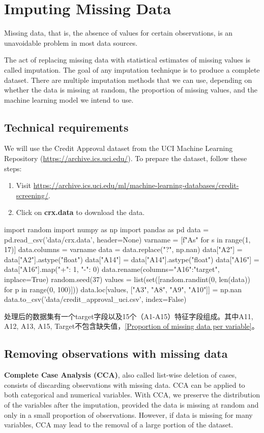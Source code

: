 \chapter{Imputing Missing Data}
Missing data, that is, the absence of values for certain observations, is an unavoidable problem in most data sources.

The act of replacing missing data with statistical estimates of missing values is called imputation.
The goal of any imputation technique is to produce a complete dataset. There are multiple imputation
methods that we can use, depending on whether the data is missing at random, the proportion of
missing values, and the machine learning model we intend to use.

\section{Technical requirements}
We will use the Credit Approval dataset from the UCI Machine Learning Repository (\url{https://archive.ics.uci.edu/}). To prepare the dataset, follow these steps:
\begin{enumerate}
    \item Visit \url{https://archive.ics.uci.edu/ml/machine-learning-databases/credit-screening/}.
    \item Click on \textbf{crx.data} to download the data.
\end{enumerate}
\begin{pyc}
import random
import numpy as np
import pandas as pd
data = pd.read_csv('data/crx.data', header=None)
varname = [f"A{s}" for s in range(1, 17)]
data.columns = varname
data = data.replace("?", np.nan)
data["A2"] = data["A2"].astype("float")
data["A14"] = data["A14"].astype("float")
data["A16"] = data["A16"].map({"+": 1, "-": 0})
data.rename(columns={"A16":"target"}, inplace=True)
random.seed(37)
values = list(set([random.randint(0, len(data)) for p in range(0, 100)]))
data.loc[values, ["A3", "A8", "A9", "A10"]] = np.nan
data.to_csv('data/credit_approval_uci.csv', index=False)
\end{pyc}


处理后的数据集有一个target字段以及15个（A1-A15）特征字段组成。其中A11, A12, A13, A15, Target不包含缺失值，\autoref{Proportion of missing data per variable}。

\section{Removing observations with missing data}
\textbf{Complete Case Analysis (CCA)}, also called list-wise deletion of cases, consists of discarding observations
with missing data. CCA can be applied to both categorical and numerical variables. With CCA, we
preserve the distribution of the variables after the imputation, provided the data is missing at random
and only in a small proportion of observations. However, if data is missing for many variables, CCA
may lead to the removal of a large portion of the dataset.
